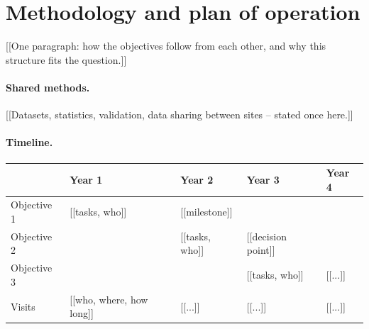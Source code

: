\documentclass[12pt,a4paper]{article}
\begin{document}
\section{Methodology and plan of operation}

[[One paragraph: how the objectives follow from each other, and why this structure fits the
question.]]

\paragraph{Shared methods.} [[Datasets, statistics, validation, data sharing between sites --
stated once here.]]

\paragraph{Timeline.}
\begin{center}
\begin{tabularx}{\linewidth}{lXXXX}
\toprule
 & Year 1 & Year 2 & Year 3 & Year 4 \\
\midrule
Objective 1 & [[tasks, who]] & [[milestone]] & & \\
Objective 2 & & [[tasks, who]] & [[decision point]] & \\
Objective 3 & & & [[tasks, who]] & [[...]] \\
Visits & [[who, where, how long]] & [[...]] & [[...]] & [[...]] \\
\bottomrule
\end{tabularx}
\end{center}
\end{document}

